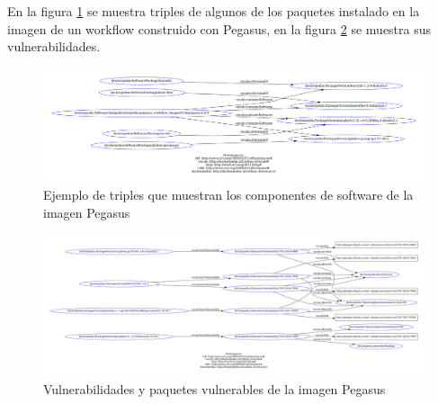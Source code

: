 En la figura  \ref{fig:packages-pegasus} se muestra triples de algunos de los paquetes instalado en la imagen de un workflow construido con Pegasus, en la figura \ref{fig:vulnerability-pegasus} se muestra sus vulnerabilidades.
\begin{figure}[t]
    \hspace*{-4cm}   
    \includegraphics[width=1.3\textwidth]{Figures/packages}
     \caption[Paquetes de la imagen Pegasus]{Ejemplo de triples que muestran los componentes de software de la imagen Pegasus}
    \label{fig:packages-pegasus}
      
\end{figure}

\begin{figure}[t]
    \hspace*{-4cm}   
    \includegraphics[width=1.3\textwidth]{Figures/packages-vuln}
      \caption[Paquetes y vulnerabilidades de la imagen Pegasus]{Vulnerabilidades y paquetes vulnerables de la imagen Pegasus}
    \label{fig:vulnerability-pegasus}
\end{figure}

